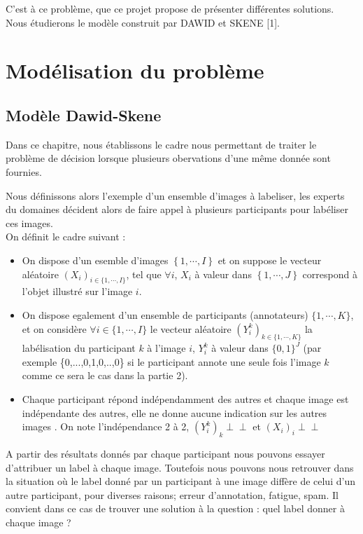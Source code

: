 \documentclass[frenchb]{report}
\newcommand{\1}{\mathbbm{1}}
\newcommand{\indep}{\perp \!\!\! \perp}
\theoremstyle{definition}\newtheorem{defn}{Définition}
\theoremstyle{definition}\newtheorem{exm}{Exemple}
\theoremstyle{definition}\newtheorem{nota}{Notation}
\theoremstyle{definition}\newtheorem{rem}{Remarque}
\begin{document}
C'est à ce problème, que ce projet propose de présenter différentes solutions. Nous étudierons le modèle construit par DAWID et SKENE [1].


\newpage

\chapter{Modélisation du problème}

\section{Modèle Dawid-Skene}

Dans ce chapitre, nous établissons le cadre nous permettant de traiter le problème de décision lorsque plusieurs obervations d'une même donnée sont fournies. 

Nous définissons alors l'exemple d'un ensemble d'images à labeliser, les experts du domaines décident alors de faire appel à plusieurs participants pour labéliser ces images.\\
On définit le cadre suivant : 

\begin{itemize}[label=\adfflowerleft]
	\item On dispose d'un esemble d'images $\left\{1,\cdots,I\right\}$ et on suppose le vecteur aléatoire $(X_i)_{i \in \{1,\cdots,I \}}$, tel que $\forall i$, $X_i$ à valeur dans $\left\{1,\cdots,J\right\}$ correspond à l'objet illustré sur l'image $i$.
	\item On dispose egalement d'un ensemble de participants (annotateurs) $\{1, \cdots, K\}$, et on considère $\forall i \in \{1, \cdots, I\}$ le vecteur aléatoire $(Y^k_i)_{k \in \{1, \cdots, K\}}$ la labélisation du participant $k$ à l'image $i$, $Y^k_i$ à valeur dans $\{0,1\}^J$ (par exemple \{0,...,0,1,0,..,0\} si le participant annote une seule fois l'image $k$ comme ce sera le cas dans la partie 2). 
	\item Chaque participant répond indépendamment des autres et chaque image est indépendante des autres, elle ne donne aucune indication sur les autres images . On note l'indépendance 2 à 2, $(Y^k_i)_k \indep$ et $(X_i)_i \indep$
\end{itemize}

A partir des résultats donnés par chaque participant nous pouvons essayer d'attribuer un label à chaque image. Toutefois nous pouvons nous retrouver dans la situation où le label donné par un participant à une image diffère de celui d'un autre participant, pour diverses raisons; erreur d'annotation, fatigue, spam. Il convient dans ce cas de trouver une solution à la question : quel label donner à chaque image ? \\
\end{document}

